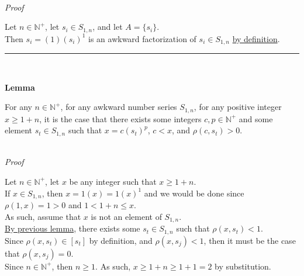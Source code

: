 \documentclass[a4paper,12pt]{article}
\begin{document}
\noindent \\
\textit{Proof}

\noindent Let $n \in \mathbb{N}^+$, let $s_i \in S_{1, n}$, and let $A = \{s_i\}$.\\

\noindent Then $s_i = (1)(s_i)^1$ is an awkward factorization of $s_i \in S_{1, n}$ \hyperlink{definition:awkward_factorization}{by definition}.


\begin{center}
\noindent\rule{8cm}{0.4pt}
\end{center}
\noindent \\




\label{lemma:non_common_factorization}
\hypertarget{lemma:non_common_factorization}{}
\begin{tcolorbox}
\textbf{Lemma}

For any $n \in \mathbb{N}^+$, for any awkward number series $S_{1,n}$, for any positive integer $x \geq 1 + n$, it is the case that there exists some integers $c, p \in \mathbb{N}^+$ and some element $s_t \in S_{1, n}$ such that $x = c(s_t)^p$, $c < x$, and $\rho(c, s_t) > 0$.

\end{tcolorbox}

\noindent \\
\textit{Proof}

\noindent Let $n \in \mathbb{N}^+$, let $x$ be any integer such that $x \geq 1 + n$.\\

\noindent If $x \in S_{1, n}$, then $x = 1(x) = 1(x)^1$ and we would be done since $\rho(1, x) = 1 > 0$ and $1 < 1 + n \leq x$.\\

\noindent As such, assume that $x$ is not an element of $S_{1, n}$.\\

\noindent \noindent \hyperlink{lemma:exists_element_less_than_x}{By previous lemma}, there exists some $s_t \in S_{1, n}$ such that $\rho(x, s_t) < 1$.\\

\noindent Since $\rho(x, s_t) \in [s_t]$ by definition, and $\rho(x, s_j) < 1$, then it must be the case that $\rho(x, s_j) = 0$.\\

\noindent Since $n \in \mathbb{N}^+$, then $n \geq 1$. As such, $x \geq 1 + n \geq 1 + 1 = 2$ by substitution.\\
\end{document}
